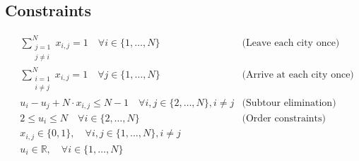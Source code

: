 \documentclass{article}
\begin{document}
\subsection*{Constraints}
\begin{align*}
& \sum_{\substack{j=1 \\ j \neq i}}^{N} x_{i,j} = 1 \quad \forall i \in \{1, \ldots, N\} & \text{(Leave each city once)} \\
& \sum_{\substack{i=1 \\ i \neq j}}^{N} x_{i,j} = 1 \quad \forall j \in \{1, \ldots, N\} & \text{(Arrive at each city once)} \\
& u_i - u_j + N \cdot x_{i,j} \leq N - 1 \quad \forall i, j \in \{2, \ldots, N\}, i \neq j & \text{(Subtour elimination)} \\
& 2 \leq u_i \leq N \quad \forall i \in \{2, \ldots, N\} & \text{(Order constraints)} \\
& x_{i,j} \in \{0, 1\}, \quad \forall i, j \in \{1, \ldots, N\}, i \neq j \\
& u_i \in \mathbb{R}, \quad \forall i \in \{1, \ldots, N\}
\end{align*}
\end{document}

